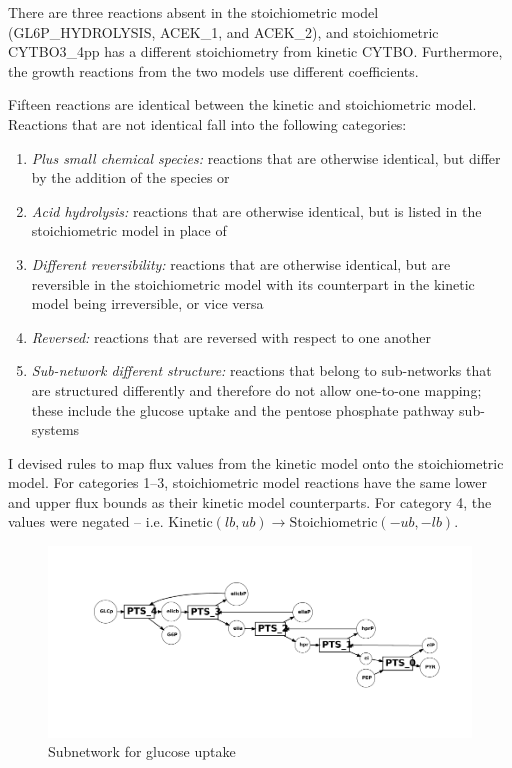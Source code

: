 \documentclass[parskip=full, numbers=noenddot]{scrreprt}
\begin{document}
There are three reactions absent in the stoichiometric model (GL6P\_HYDROLYSIS, ACEK\_1, and ACEK\_2), and stoichiometric CYTBO3\_4pp has a different stoichiometry from kinetic CYTBO. Furthermore, the growth reactions from the two models use different coefficients.

Fifteen reactions are identical between the kinetic and stoichiometric model. Reactions that are not identical fall into the following categories:

\begin{enumerate}
\item \emph{Plus small chemical species:} reactions that are otherwise identical, but differ by the addition of the species  or 
\item \emph{Acid hydrolysis:} reactions that are otherwise identical, but  is listed in the stoichiometric model in place of 
\item \emph{Different reversibility:} reactions that are otherwise identical, but are reversible in the stoichiometric model with its counterpart in the kinetic model being irreversible, or vice versa
\item \emph{Reversed:} reactions that are reversed with respect to one another
  \item \emph{Sub-network different structure:} reactions that belong to sub-networks that are structured differently and therefore do not allow one-to-one mapping; these include the glucose uptake and the pentose phosphate pathway sub-systems
  \end{enumerate}

I devised rules to map flux values from the kinetic model onto the stoichiometric model. For categories 1--3, stoichiometric model reactions have the same lower and upper flux bounds as their kinetic model counterparts. For category 4, the values were negated -- i.e. $ \mathrm{Kinetic } (lb, ub) \rightarrow \mathrm{Stoichiometric } (-ub, -lb)$. %

\begin{figure}[p]
  \centering
  \includegraphics[scale=0.4]{glucoseuptake}
  \caption{Subnetwork for glucose uptake}
  \label{fig:glucoseuptake}
\end{figure}
\end{document}

